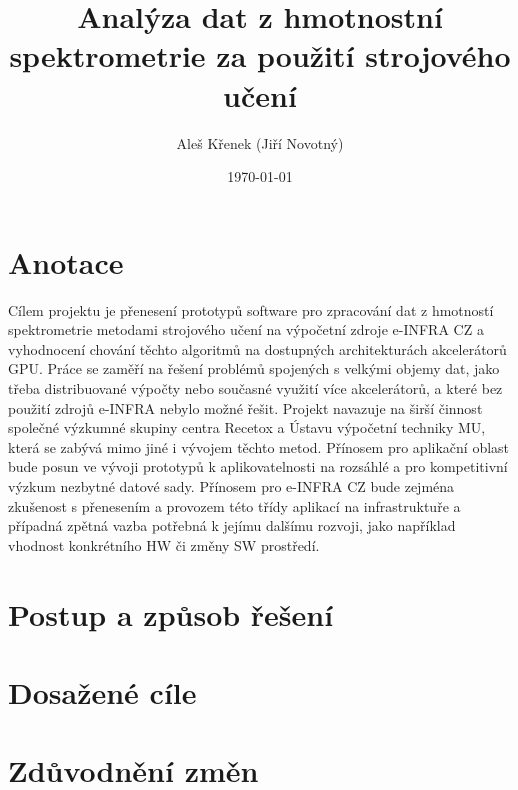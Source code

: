 \documentclass[a4paper,11pt]{article}
\title{Analýza dat z hmotnostní spektrometrie za použití strojového učení}
\author{Aleš Křenek (Jiří Novotný)}
\date{\today}
\begin{document}
\maketitle

\section{Anotace}
Cílem projektu je přenesení prototypů software pro zpracování dat z hmotností
spektrometrie metodami strojového učení na výpočetní zdroje e-INFRA CZ a
vyhodnocení chování těchto algoritmů na dostupných architekturách akcelerátorů
GPU. Práce se zaměří na řešení problémů spojených s velkými objemy dat, jako
třeba distribuované výpočty nebo současné využití více akcelerátorů, a které
bez použití zdrojů e-INFRA nebylo možné řešit. Projekt navazuje na širší
činnost společné výzkumné skupiny centra Recetox a Ústavu výpočetní techniky MU,
která se zabývá mimo jiné i vývojem těchto metod. Přínosem pro aplikační oblast
bude posun ve vývoji prototypů k aplikovatelnosti na rozsáhlé a pro
kompetitivní výzkum nezbytné datové sady. Přínosem pro e-INFRA CZ bude zejména
zkušenost s přenesením a provozem této třídy aplikací na infrastruktuře a
případná zpětná vazba potřebná k jejímu dalšímu rozvoji, jako například
vhodnost konkrétního HW či změny SW prostředí.


\section{Postup a způsob řešení}










\section{Dosažené cíle}



\section{Zdůvodnění změn}
\end{document}

